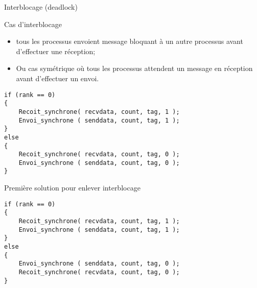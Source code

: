 \documentclass[handout]{beamer}
\begin{document}
\begin{frame}[fragile]{Interblocage (deadlock)}

\begin{block}{Cas d'interblocage}
\begin{itemize}
\item tous les processus envoient message bloquant à un autre processus
avant d'effectuer une réception;
\item Ou  cas symétrique où tous les processus attendent un message en réception
avant d'effectuer un envoi.
\end{itemize}
\end{block}

\begin{example}
\begin{lstlisting}
if (rank == 0)
{
    Recoit_synchrone( recvdata, count, tag, 1 );
    Envoi_synchrone ( senddata, count, tag, 1 );
}
else
{
    Recoit_synchrone( recvdata, count, tag, 0 );
    Envoi_synchrone ( senddata, count, tag, 0 );
}
\end{lstlisting}
\end{example}

\end{frame}

\begin{frame}[fragile]{Première solution pour enlever interblocage}

\begin{lstlisting}
if (rank == 0)
{
    Recoit_synchrone( recvdata, count, tag, 1 );
    Envoi_synchrone ( senddata, count, tag, 1 );
}
else
{
    Envoi_synchrone ( senddata, count, tag, 0 );
    Recoit_synchrone( recvdata, count, tag, 0 );
}
\end{lstlisting}

\end{frame}
\end{document}
